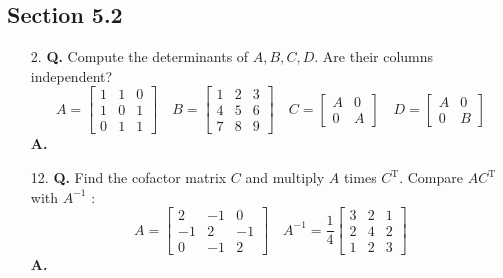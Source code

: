 \documentclass[main.tex]{subfiles}
\begin{document}
\subsection{Section 5.2}
\begin{enumerate}
    \item [2.] \textbf{Q.} Compute the determinants of $A, B, C, D$. Are their columns independent?
    $$
    A=\left[\begin{array}{lll}
    1 & 1 & 0 \\
    1 & 0 & 1 \\
    0 & 1 & 1
    \end{array}\right] \quad B=\left[\begin{array}{lll}
    1 & 2 & 3 \\
    4 & 5 & 6 \\
    7 & 8 & 9
    \end{array}\right] \quad C=\left[\begin{array}{ll}
    A & 0 \\
    0 & A
    \end{array}\right] \quad D=\left[\begin{array}{cc}
    A & 0 \\
    0 & B
    \end{array}\right]
    $$
    \textbf{A.}
    
    \item [12.] \textbf{Q.} Find the cofactor matrix $C$ and multiply $A$ times $C^{\mathrm{T}}$. Compare $A C^{\mathrm{T}}$ with $A^{-1}$ :
    $$
    A=\left[\begin{array}{rrr}
    2 & -1 & 0 \\
    -1 & 2 & -1 \\
    0 & -1 & 2
    \end{array}\right] \quad A^{-1}=\frac{1}{4}\left[\begin{array}{lll}
    3 & 2 & 1 \\
    2 & 4 & 2 \\
    1 & 2 & 3
    \end{array}\right]
    $$
    \textbf{A.}
    

\end{enumerate}
\end{document}
